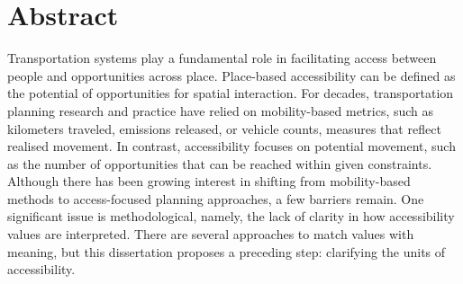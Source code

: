 \documentclass[
11pt, %
oneside, %
english, %
singlespacing, %
]{macthesis} %
\begin{document}

\section*{\Huge Abstract}
\addchaptertocentry{\abstractname}
Transportation systems play a fundamental role in facilitating access between people and opportunities across place. Place-based accessibility can be defined as the potential of opportunities for spatial interaction. For decades, transportation planning research and practice have relied on mobility-based metrics, such as kilometers traveled, emissions released, or vehicle counts, measures that reflect realised movement. In contrast, accessibility focuses on potential movement, such as the number of opportunities that can be reached within given constraints. Although there has been growing interest in shifting from mobility-based methods to access-focused planning approaches, a few barriers remain. One significant issue is methodological, namely, the lack of clarity in how accessibility values are interpreted. There are several approaches to match values with meaning, but this dissertation proposes a preceding step: clarifying the units of accessibility.
\end{document}
